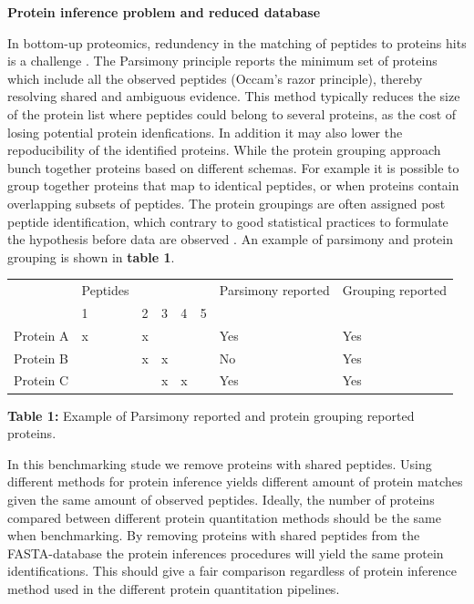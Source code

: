 \documentclass[10pt,letterpaper]{article}
\begin{document}
\textbf{Protein inference problem and reduced database}

In bottom-up proteomics, redundency in the matching of peptides to proteins hits is a challenge \cite{nesvizhskii2005interpretation}. The Parsimony principle reports the minimum set of proteins which include all the observed peptides (Occam's razor principle), thereby resolving shared and ambiguous evidence. This method typically reduces the size of the protein list where peptides could belong to several proteins, as the cost of losing potential protein idenfications. In addition it may also lower the repoducibility of the identified proteins\cite{serang2012recognizing}. While the protein grouping approach bunch together proteins based on different schemas. For example it is possible to group together proteins that map to identical peptides, or when proteins contain overlapping subsets of peptides. The protein groupings are often assigned post peptide identification, which contrary to good statistical practices to formulate the hypothesis before data are observed \cite{serang2012recognizing}. An example of parsimony and protein grouping is shown in \textbf{table 1}. 

\begin{table}[!htbp]
\begin{tabular}{llllllll}
          & Peptides &   &   &   &   & Parsimony reported & Grouping reported \\
          & 1        & 2 & 3 & 4 & 5 &                    &                   \\
Protein A & x        & x &   &   &   & Yes                & Yes               \\
Protein B &          & x & x &   &   & No                 & Yes               \\
Protein C &          &   & x & x &   & Yes                & Yes              	
\end{tabular}
\newline
\textbf{Table 1:} Example of Parsimony reported and protein grouping reported proteins.
\end{table}

In this benchmarking stude we remove proteins with shared peptides. Using different methods for protein inference yields different amount of protein matches given the same amount of observed peptides. Ideally, the number of proteins compared between different protein quantitation methods should be the same when benchmarking. By removing proteins with shared peptides from the FASTA-database the protein inferences procedures will yield the same protein identifications. This should give a fair comparison regardless of protein inference method used in the different protein quantitation pipelines.
\end{document}
